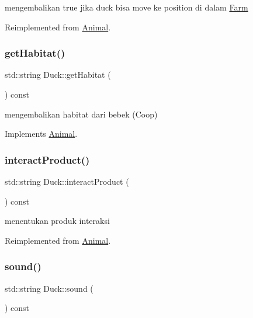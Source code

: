 mengembalikan true jika duck bisa move ke position di dalam \mbox{\hyperlink{class_farm}{Farm}} 

Reimplemented from \mbox{\hyperlink{class_animal_a0529aaf00a6368ea123110683cc4e2f2}{Animal}}.

\mbox{\label{class_duck_ada6104f405921dc1aaf38a7df72a8465}} 
\subsubsection{\texorpdfstring{getHabitat()}{getHabitat()}}
{\footnotesize\ttfamily std\+::string Duck\+::get\+Habitat (\begin{DoxyParamCaption}{ }\end{DoxyParamCaption}) const\hspace{0.3cm}{\ttfamily [virtual]}}

mengembalikan habitat dari bebek (Coop) 

Implements \mbox{\hyperlink{class_animal_a3de687fb42b792132a09176c4a0e2125}{Animal}}.

\mbox{\label{class_duck_a38e775e1f4ab667eeb997fb36837b456}} 
\subsubsection{\texorpdfstring{interactProduct()}{interactProduct()}}
{\footnotesize\ttfamily std\+::string Duck\+::interact\+Product (\begin{DoxyParamCaption}{ }\end{DoxyParamCaption}) const\hspace{0.3cm}{\ttfamily [virtual]}}

menentukan produk interaksi 

Reimplemented from \mbox{\hyperlink{class_animal_a8e99d809fbff9cea27dee5a785932dc6}{Animal}}.

\mbox{\label{class_duck_a26799f737ee32fd2b7cd871ec1a2727f}} 
\subsubsection{\texorpdfstring{sound()}{sound()}}
{\footnotesize\ttfamily std\+::string Duck\+::sound (\begin{DoxyParamCaption}{ }\end{DoxyParamCaption}) const\hspace{0.3cm}{\ttfamily [virtual]}}

